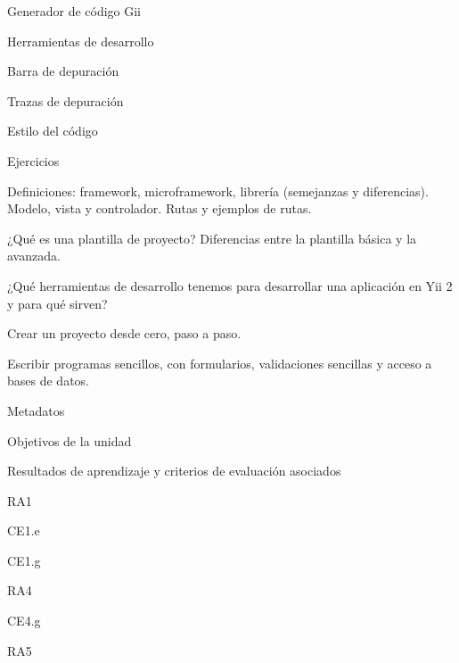 \begin{longenum}
\begin{longenum}
        \item Generador de código Gii
        \item Herramientas de desarrollo
        \begin{longenum}
            \item Barra de depuración
            \item Trazas de depuración
        \end{longenum}
        \item Estilo del código
        \item Ejercicios
        \begin{longenum}
            \item Definiciones: framework, microframework, librería (semejanzas y diferencias). Modelo, vista y controlador. Rutas y ejemplos de rutas.
            \item ¿Qué es una plantilla de proyecto? Diferencias entre la plantilla básica y la avanzada.
            \item ¿Qué herramientas de desarrollo tenemos para desarrollar una aplicación en Yii 2 y para qué sirven?
            \item Crear un proyecto desde cero, paso a paso.
            \item Escribir programas sencillos, con formularios, validaciones sencillas y acceso a bases de datos.
        \end{longenum}
        \item Metadatos
        \begin{longenum}
            \item Objetivos de la unidad
            \item Resultados de aprendizaje y criterios de evaluación asociados
            \begin{longenum}
                \item RA1
                \begin{longenum}
                    \item CE1.e
                    \item CE1.g
                \end{longenum}
                \item RA4
                \begin{longenum}
                    \item CE4.g
                \end{longenum}
                \item RA5
                \begin{longenum}

\end{longenum}
\end{longenum}
\end{longenum}
\end{longenum}
\end{longenum}
